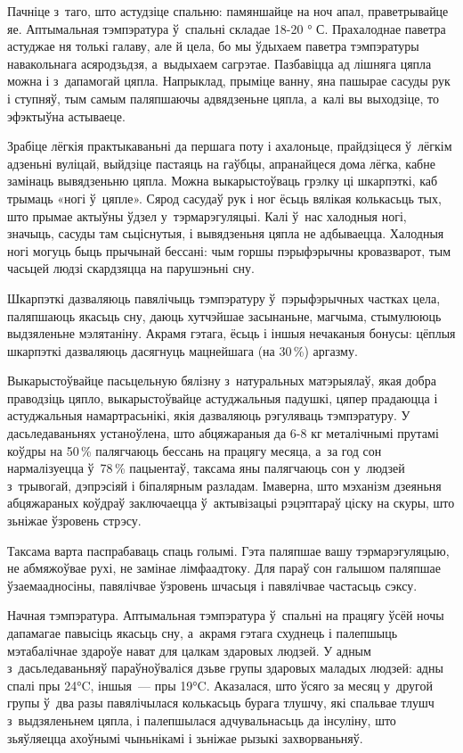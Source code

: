 Пачніце з~таго, што астудзіце спальню: памяншайце на ноч апал, праветрывайце яе. Аптымальная тэмпэратура ў~спальні складае 18-20 ° С. Прахалоднае паветра астуджае ня толькі галаву, але й цела, бо мы ўдыхаем паветра тэмпэратуры навакольнага асяродзьдзя, а~выдыхаем сагрэтае. Пазбавіцца ад лішняга цяпла можна і з~дапамогай цяпла. Напрыклад, прыміце ванну, яна пашырае сасуды рук і ступняў, тым самым паляпшаючы адвядзеньне цяпла, а~калі вы выходзіце, то эфэктыўна астываеце.

Зрабіце лёгкія практыкаваньні да першага поту і ахалоньце, прайдзіцеся ў~лёгкім адзеньні вуліцай, выйдзіце пастаяць на гаўбцы, апранайцеся дома лёгка, кабне замінаць вывядзеньню цяпла. Можна выкарыстоўваць грэлку ці шкарпэткі, каб трымаць «ногі ў~цяпле». Сярод сасудаў рук і ног ёсьць вялікая колькасьць тых, што прымае актыўны ўдзел у~тэрмарэгуляцыі. Калі ў~нас халодныя ногі, значыць, сасуды там сьціснутыя, і вывядзеньня цяпла не адбываецца. Халодныя ногі могуць быць прычынай бессані: чым горшы пэрыфэрычны кровазварот, тым часьцей людзі скардзяцца на парушэньні сну.

Шкарпэткі дазваляюць павялічыць тэмпэратуру ў~пэрыфэрычных частках цела, паляпшаюць якасьць сну, даюць хутчэйшае засынаньне, магчыма, стымулююць выдзяленьне мэлятаніну. Акрамя гэтага, ёсьць і іншыя нечаканыя бонусы: цёплыя шкарпэткі дазваляюць дасягнуць мацнейшага (на 30\,\%) аргазму.

Выкарыстоўвайце пасьцельную бялізну з~натуральных матэрыялаў, якая добра праводзіць цяпло, выкарыстоўвайце астуджальныя падушкі, цяпер прадаюцца і астуджальныя намартрасьнікі, якія дазваляюць рэгуляваць тэмпэратуру. У дасьледаваньнях устаноўлена, што абцяжараныя да 6-8 кг металічнымі прутамі коўдры на 50\,\% палягчаюць бессань на працягу месяца, а~за год сон нармалізуецца ў~78\,\% пацыентаў, таксама яны палягчаюць сон у~людзей з~трывогай, дэпрэсіяй і біпалярным разладам. Імаверна, што мэханізм дзеяньня абцяжараных коўдраў заключаецца ў~актывізацыі рэцэптараў ціску на скуры, што зьніжае ўзровень стрэсу.

Таксама варта паспрабаваць спаць голымі. Гэта паляпшае вашу тэрмарэгуляцыю, не абмяжоўвае рухі, не замінае лімфаадтоку. Для параў сон галышом паляпшае ўзаемаадносіны, павялічвае ўзровень шчасьця і павялічвае частасьць сэксу.

Начная тэмпэратура. Аптымальная тэмпэратура ў~спальні на працягу ўсёй ночы дапамагае павысіць якасьць сну, а~акрамя гэтага схуднець і палепшыць мэтабалічнае здароўе нават для цалкам здаровых людзей. У адным з~дасьледаваньняў параўноўваліся дзьве групы здаровых маладых людзей: адны спалі пры 24°C, іншыя~--- пры 19°C. Аказалася, што ўсяго за месяц у~другой групы ў~два разы павялічылася колькасьць бурага тлушчу, які спальвае тлушч з~выдзяленьнем цяпла, і палепшылася адчувальнасьць да інсуліну, што зьяўляецца ахоўнымі чыньнікамі і зьніжае рызыкі захворваньняў.

